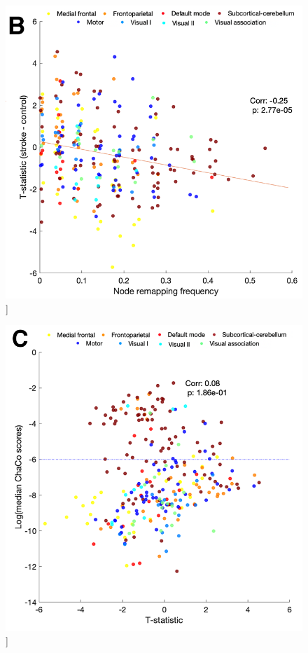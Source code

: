 \documentclass[phd,tocprelim]{cornell}
\renewcommand{\caption}[1]{\singlespacing\hangcaption{#1}\normalspacing}
\begin{document}
\begin{figure}[h!]
		\ContinuedFloat
		\captionsetup{labelformat=adja-page}
    \centering
    \includegraphics[width=\textwidth]{chapter1/SupplementaryFigure10B.png}
    \caption[]{}
\end{figure}
\null
\vfill
\clearpage
\null
\vfill
\begin{figure}[h!]
		\ContinuedFloat
		\captionsetup{labelformat=adja-page}
    \centering
    \includegraphics[width=\textwidth]{chapter1/SupplementaryFigure10C.png}
    \caption[]{}
\end{figure}
\end{document}

